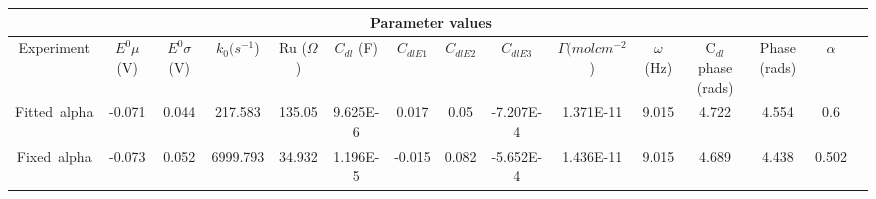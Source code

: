 \documentclass[preview]{standalone}
\begin{document}
\begin{center}
\begin{tabular}{|c|c|c|c|c|c|c|c|c|c|c|c|c|c|c|}
\hline
\multicolumn{14}{|c|}{Parameter values}\\ 
\hline
Experiment & $E^0 \mu$ (V) & $E^0 \sigma$ (V) & $k_0 (s^{-1}$) & Ru ($\Omega$) & $C_{dl}$ (F) & $C_{dlE1}$ & $C_{dlE2}$ & $C_{dlE3}$ & $\Gamma (mol cm^{-2}$) & $\omega$ (Hz) & C$_{dl}$ phase (rads) & Phase (rads) & $\alpha$\\
\hline
Fitted\ alpha & -0.071 & 0.044 & 217.583 & 135.05 & 9.625E-6 & 0.017 & 0.05 & -7.207E-4 & 1.371E-11 & 9.015 & 4.722 & 4.554 & 0.6\\
\hline
Fixed\ alpha & -0.073 & 0.052 & 6999.793 & 34.932 & 1.196E-5 & -0.015 & 0.082 & -5.652E-4 & 1.436E-11 & 9.015 & 4.689 & 4.438 & 0.502\\
\hline
\end{tabular}
\end{center}
\end{document}
